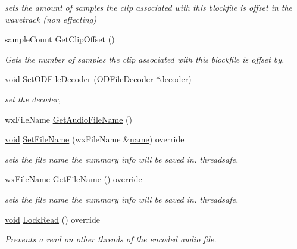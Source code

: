 \begin{DoxyCompactItemize}
\begin{DoxyCompactList}\small\item\em sets the amount of samples the clip associated with this blockfile is offset in the wavetrack (non effecting) \end{DoxyCompactList}\item 
\hyperlink{include_2audacity_2_types_8h_afa427e1f521ea5ec12d054e8bd4d0f71}{sample\+Count} \hyperlink{class_o_d_decode_block_file_ac27ea9d10ab8005214d16e91a8b43ee4}{Get\+Clip\+Offset} ()
\begin{DoxyCompactList}\small\item\em Gets the number of samples the clip associated with this blockfile is offset by. \end{DoxyCompactList}\item 
\hyperlink{sound_8c_ae35f5844602719cf66324f4de2a658b3}{void} \hyperlink{class_o_d_decode_block_file_a7304b760adc7613d3cd8435177e865f3}{Set\+O\+D\+File\+Decoder} (\hyperlink{class_o_d_file_decoder}{O\+D\+File\+Decoder} $\ast$decoder)
\begin{DoxyCompactList}\small\item\em set the decoder, \end{DoxyCompactList}\item 
wx\+File\+Name \hyperlink{class_o_d_decode_block_file_a7fd7ae976d74f4e103d78b9eaa9c7c73}{Get\+Audio\+File\+Name} ()
\item 
\hyperlink{sound_8c_ae35f5844602719cf66324f4de2a658b3}{void} \hyperlink{class_o_d_decode_block_file_a399d5106b382c4e57aca85a386191f74}{Set\+File\+Name} (wx\+File\+Name \&\hyperlink{lib_2expat_8h_a1b49b495b59f9e73205b69ad1a2965b0}{name}) override
\begin{DoxyCompactList}\small\item\em sets the file name the summary info will be saved in. threadsafe. \end{DoxyCompactList}\item 
wx\+File\+Name \hyperlink{class_o_d_decode_block_file_af09386a4f50fae5d7443d3f0a574c6bd}{Get\+File\+Name} () override
\begin{DoxyCompactList}\small\item\em sets the file name the summary info will be saved in. threadsafe. \end{DoxyCompactList}\item 
\hyperlink{sound_8c_ae35f5844602719cf66324f4de2a658b3}{void} \hyperlink{class_o_d_decode_block_file_abb091b40dda043da3921d1aada4f91d6}{Lock\+Read} () override
\begin{DoxyCompactList}\small\item\em Prevents a read on other threads of the encoded audio file. \end{DoxyCompactList}\item 

\end{DoxyCompactItemize}
